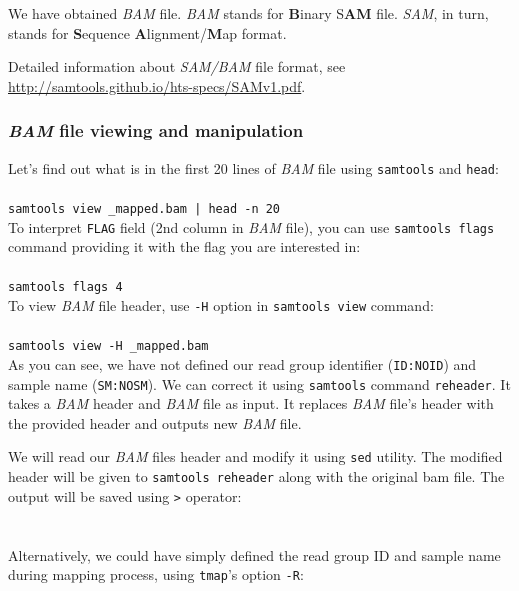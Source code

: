 We have obtained \textit{BAM} file. \textit{BAM} stands for \textbf{B}inary S\textbf{AM} file.
\textit{SAM}, in turn, stands for \textbf{S}equence \textbf{A}lignment/\textbf{M}ap format.

Detailed information about \textit{SAM/BAM} file format, see \url{http://samtools.github.io/hts-specs/SAMv1.pdf}.
\subsubsection{\textit{BAM} file viewing and manipulation}
Let's find out what is in the first 20 lines of \textit{BAM} file using \texttt{samtools} and \texttt{head}:\\~\\
\texttt{samtools view \mapReads\_mapped.bam | head -n 20}\\


To interpret \texttt{FLAG} field (2nd column in \textit{BAM} file), you
can use \texttt{samtools flags} command providing it with the flag you are interested in:\\~\\
\texttt{samtools flags 4}\\

To view \textit{BAM} file header, use 
\texttt{-H} option in \texttt{samtools view} command:\\~\\
\texttt{samtools view -H \mapReads\_mapped.bam}\\

As you can see, we have not defined our read group identifier (\texttt{ID:NOID})
and sample name (\texttt{SM:NOSM}). We can correct it using \texttt{samtools}
command \texttt{reheader}. It takes a \textit{BAM} header and \textit{BAM} file
as input. It replaces \textit{BAM} file's header with the provided header and 
outputs new \textit{BAM} file.

We will read our \textit{BAM} files header and modify it using \texttt{sed}
utility. The modified header will be given to \texttt{samtools reheader}
along with the original bam file. The output will be saved using \texttt{>}
operator:\\~\\
\\

Alternatively, we could have simply defined the read group ID and sample name during mapping process,
using \texttt{tmap}'s option \texttt{-R}:\\~\\%
\\

